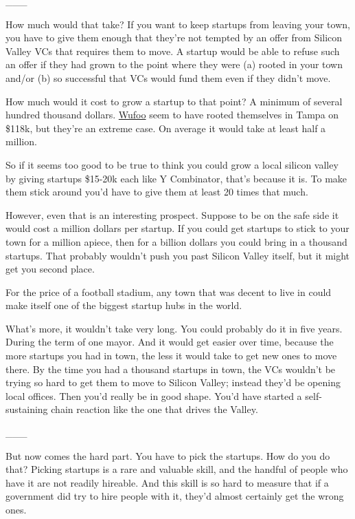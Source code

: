 \_\_\_

How much would that take? If you want to keep startups from leaving your
town, you have to give them enough that they're not tempted by an offer
from Silicon Valley VCs that requires them to move. A startup would be
able to refuse such an offer if they had grown to the point where they
were (a) rooted in your town and/or (b) so successful that VCs would
fund them even if they didn't move.

How much would it cost to grow a startup to that point? A minimum of
several hundred thousand dollars. \href{http://wufoo.com}{Wufoo} seem to
have rooted themselves in Tampa on \$118k, but they're an extreme case.
On average it would take at least half a million.

So if it seems too good to be true to think you could grow a local
silicon valley by giving startups \$15-20k each like Y Combinator,
that's because it is. To make them stick around you'd have to give them
at least 20 times that much.

However, even that is an interesting prospect. Suppose to be on the safe
side it would cost a million dollars per startup. If you could get
startups to stick to your town for a million apiece, then for a billion
dollars you could bring in a thousand startups. That probably wouldn't
push you past Silicon Valley itself, but it might get you second place.

For the price of a football stadium, any town that was decent to live in
could make itself one of the biggest startup hubs in the world.

What's more, it wouldn't take very long. You could probably do it in
five years. During the term of one mayor. And it would get easier over
time, because the more startups you had in town, the less it would take
to get new ones to move there. By the time you had a thousand startups
in town, the VCs wouldn't be trying so hard to get them to move to
Silicon Valley; instead they'd be opening local offices. Then you'd
really be in good shape. You'd have started a self-sustaining chain
reaction like the one that drives the Valley.

\_\_\_

But now comes the hard part. You have to pick the startups. How do you
do that? Picking startups is a rare and valuable skill, and the handful
of people who have it are not readily hireable. And this skill is so
hard to measure that if a government did try to hire people with it,
they'd almost certainly get the wrong ones.

